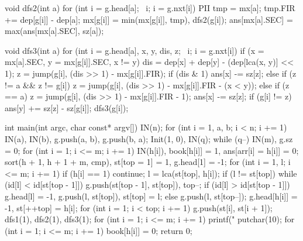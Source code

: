 \begin{cppcode}
void dfs2(int a) {
  for (int i = g.head[a]; ~i; i = g.nxt[i]) {
    PII tmp = mx[a];
    tmp.FIR += dep[g[i]] - dep[a];
    mx[g[i]] = min(mx[g[i]], tmp), dfs2(g[i]);
  }
  ans[mx[a].SEC] = max(ans[mx[a].SEC], sz[a]);
}

void dfs3(int a) {
  for (int i = g.head[a], x, y, dis, z; ~i; i = g.nxt[i]) {
    if (x = mx[a].SEC, y = mx[g[i]].SEC, x != y) {
      dis = dep[x] + dep[y] - (dep[lca(x, y)] << 1);
      z = jump(g[i], (dis >> 1) - mx[g[i]].FIR);
      if (dis & 1)
        ans[x] -= sz[z];
      else {
        if (z != a && z != g[i])
          z = jump(g[i], (dis >> 1) - mx[g[i]].FIR - (x < y));
        else if (z == a)
          z = jump(g[i], (dis >> 1) - mx[g[i]].FIR - 1);
        ans[x] -= sz[z];
      }
      if (g[i] != z) ans[y] += sz[z] - sz[g[i]];
    }
    dfs3(g[i]);
  }
}

int main(int argc, char const* argv[]) {
  IN(n);
  for (int i = 1, a, b; i < n; i += 1) IN(a), IN(b), g.push(a, b), g.push(b, a);
  Init(1, 0), IN(q);
  while (q--) {
    IN(m), g.sz = 0;
    for (int i = 1; i <= m; i += 1)
      IN(h[i]), book[h[i]] = 1, ans[arr[i] = h[i]] = 0;
    sort(h + 1, h + 1 + m, cmp), st[top = 1] = 1, g.head[1] = -1;
    for (int i = 1, l; i <= m; i += 1) {
      if (h[i] == 1) continue;
      l = lca(st[top], h[i]);
      if (l != st[top]) {
        while (id[l] < id[st[top - 1]]) g.push(st[top - 1], st[top]), top--;
        if (id[l] > id[st[top - 1]])
          g.head[l] = -1, g.push(l, st[top]), st[top] = l;
        else
          g.push(l, st[top--]);
      }
      g.head[h[i]] = -1, st[++top] = h[i];
    }
    for (int i = 1; i < top; i += 1) g.push(st[i], st[i + 1]);
    dfs1(1), dfs2(1), dfs3(1);
    for (int i = 1; i <= m; i += 1) printf("%
    putchar(10);
    for (int i = 1; i <= m; i += 1) book[h[i]] = 0;
  }
  return 0;
}
\end{cppcode}
